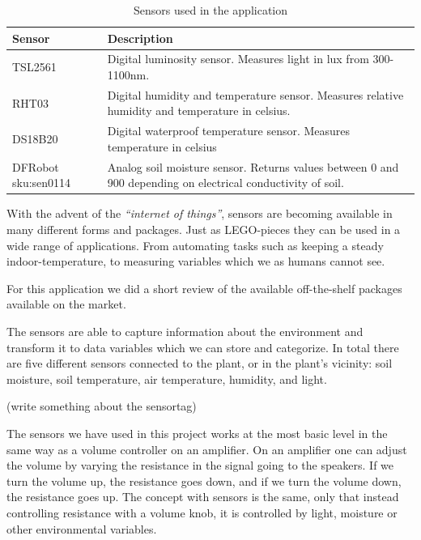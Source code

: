 \def\arraystretch{1.8}
\begin{table}
    \begin{tabular}{|l|p{250pt}|}
    \hline
    \textbf{Sensor}               & \textbf{Description}                                                                                                  \\ \hline
    TSL2561              & Digital luminosity sensor. Measures light in lux from 300-1100nm.                                            \\ \hline
    RHT03                & Digital humidity and temperature sensor. Measures relative humidity and temperature in celsius.              \\ \hline
    DS18B20              & Digital waterproof temperature sensor. Measures temperature in celsius                                       \\ \hline
    DFRobot sku:sen0114  & Analog soil moisture sensor. Returns values between 0 and 900 depending on electrical conductivity of soil.  \\ \hline
    \end{tabular}
    \caption{Sensors used in the application}
\end{table}


With the advent of the \emph{“internet of things”}, sensors are becoming available in many different forms and packages. Just as LEGO-pieces they can be used in a wide range of applications. From automating tasks such as keeping a steady indoor-temperature, to measuring variables which we as humans cannot see. 

For this application we did a short review of the available off-the-shelf packages available on the market. 

The sensors are able to capture information about the environment and transform it to data variables which we can store and categorize. In total there are five different sensors connected to the plant, or in the plant’s vicinity: soil moisture, soil temperature, air temperature, humidity, and light. 


(write something about the sensortag)

The sensors we have used in this project works at the most basic level in the same way as a volume controller on an amplifier. On an amplifier one can adjust the volume by varying the resistance in the signal going to the speakers. If we turn the volume up, the resistance goes down, and if we turn the volume down, the resistance goes up. The concept with sensors is the same, only that instead controlling resistance with a volume knob, it is controlled by light, moisture or other environmental variables. 

